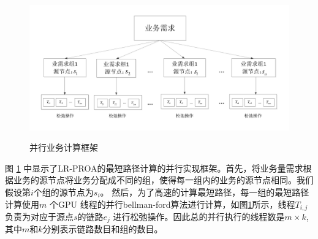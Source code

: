 \begin{figure}
\setlength{\belowcaptionskip}{-0.5cm}
\begin{center}
{\includegraphics[width=1 \textwidth]{figures/paframework.pdf}}
\end{center}
\caption{{\footnotesize{并行业务计算框架}}}
\label{ParFramework}
\end{figure}

图 \ref{ParFramework} 中显示了LR-PROA的最短路径计算的并行实现框架。首先，将业务量需求根据业务的源节点将业务分配成不同的组，使得每一组内的业务的源节点相同。我们假设第$i$个组的源节点为$s_i$。 然后，为了高速的计算最短路径，每一组的最短路径计算使用$m$ 个GPU 线程的并行bellman-ford算法进行计算，如图\ref{ParFramework}所示，线程$T_{i,j}$负责为对应于源点$s$的链路$e_{j}$ 进行松弛操作。因此总的并行执行的线程数是$m \times k$,其中$m$和$k$分别表示链路数目和组的数目。

